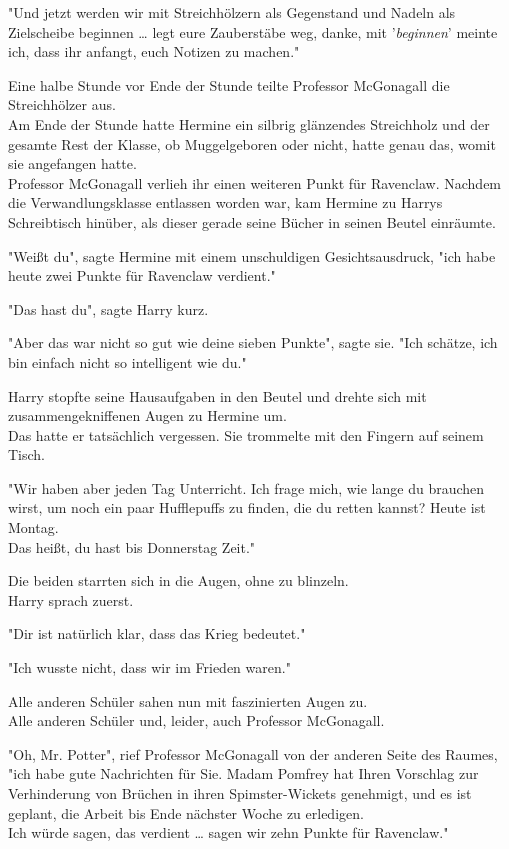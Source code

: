 {"Und jetzt werden wir mit Streichhölzern als Gegenstand und Nadeln als Zielscheibe beginnen … legt eure Zauberstäbe weg, danke, mit '\emph{beginnen}' meinte ich, dass ihr anfangt, euch Notizen zu machen."

Eine halbe Stunde vor Ende der Stunde teilte Professor McGonagall die Streichhölzer aus.\\ Am Ende der Stunde hatte Hermine ein silbrig glänzendes Streichholz und der gesamte Rest der Klasse, ob Muggelgeboren oder nicht, hatte genau das, womit sie angefangen hatte.\\ Professor McGonagall verlieh ihr einen weiteren Punkt für Ravenclaw. Nachdem die Verwandlungsklasse entlassen worden war, kam Hermine zu Harrys Schreibtisch hinüber, als dieser gerade seine Bücher in seinen Beutel einräumte.

"Weißt du", sagte Hermine mit einem unschuldigen Gesichtsausdruck, "ich habe heute zwei Punkte für Ravenclaw verdient."

"Das hast du", sagte Harry kurz.

"Aber das war nicht so gut wie deine sieben Punkte", sagte sie. "Ich schätze, ich bin einfach nicht so intelligent wie du."

Harry stopfte seine Hausaufgaben in den Beutel und drehte sich mit zusammengekniffenen Augen zu Hermine um.\\ Das hatte er tatsächlich vergessen. Sie trommelte mit den Fingern auf seinem Tisch.

"Wir haben aber jeden Tag Unterricht. Ich frage mich, wie lange du brauchen wirst, um noch ein paar Hufflepuffs zu finden, die du retten kannst? Heute ist Montag.\\ Das heißt, du hast bis Donnerstag Zeit."

Die beiden starrten sich in die Augen, ohne zu blinzeln.\\ Harry sprach zuerst.

"Dir ist natürlich klar, dass das Krieg bedeutet."

"Ich wusste nicht, dass wir im Frieden waren."

Alle anderen Schüler sahen nun mit faszinierten Augen zu.\\ Alle anderen Schüler und, leider, auch Professor McGonagall.

"Oh, Mr. Potter", rief Professor McGonagall von der anderen Seite des Raumes,\\ "ich habe gute Nachrichten für Sie. Madam Pomfrey hat Ihren Vorschlag zur Verhinderung von Brüchen in ihren Spimster-Wickets genehmigt, und es ist geplant, die Arbeit bis Ende nächster Woche zu erledigen.\\ Ich würde sagen, das verdient … sagen wir zehn Punkte für Ravenclaw."

}
